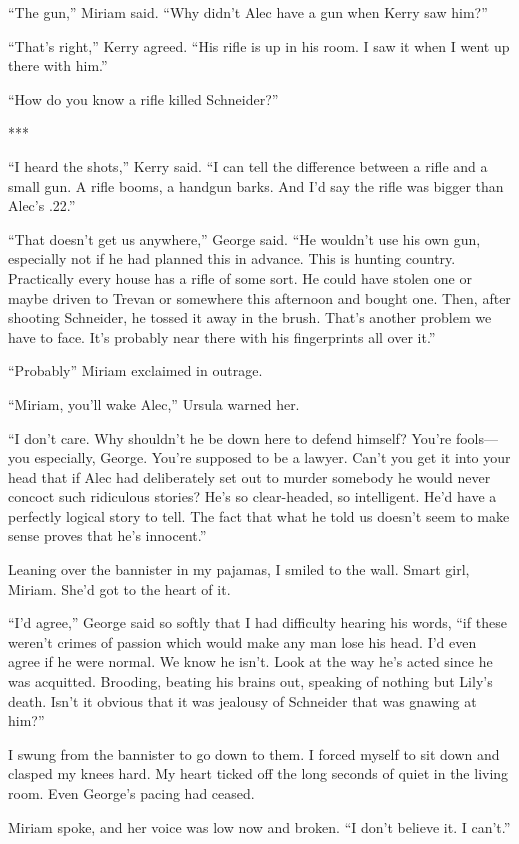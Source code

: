 {“The gun,” Miriam said. “Why didn’t Alec have a gun when Kerry saw him?”

“That’s right,” Kerry agreed. “His rifle is up in his room. I saw it when I went up there with him.”

“How do you know a rifle killed Schneider?”

***

“I heard the shots,” Kerry said. “I can tell the difference between a rifle and a small gun. A rifle booms, a handgun barks. And I’d say the rifle was bigger than Alec’s .22.”

“That doesn’t get us anywhere,” George said. “He wouldn’t use his own gun, especially not if he had planned this in advance. This is hunting country. Practically every house has a rifle of some sort. He could have stolen one or maybe driven to Trevan or somewhere this afternoon and bought one. Then, after shooting Schneider, he tossed it away in the brush. That’s another problem we have to face. It’s probably near there with his fingerprints all over it.”

“Probably” Miriam exclaimed in outrage.

“Miriam, you’ll wake Alec,” Ursula warned her.

“I don’t care. Why shouldn’t he be down here to defend himself? You’re fools—you especially, George. You’re supposed to be a lawyer. Can’t you get it into your head that if Alec had deliberately set out to murder somebody he would never concoct such ridiculous stories? He’s so clear-headed, so intelligent. He’d have a perfectly logical story to tell. The fact that what he told us doesn’t seem to make sense proves that he’s innocent.”

Leaning over the bannister in my pajamas, I smiled to the wall. Smart girl, Miriam. She’d got to the heart of it.

“I’d agree,” George said so softly that I had difficulty hearing his words, “if these weren’t crimes of passion which would make any man lose his head. I’d even agree if he were normal. We know he isn’t. Look at the way he’s acted since he was acquitted. Brooding, beating his brains out, speaking of nothing but Lily’s death. Isn’t it obvious that it was jealousy of Schneider that was gnawing at him?”

I swung from the bannister to go down to them. I forced myself to sit down and clasped my knees hard. My heart ticked off the long seconds of quiet in the living room. Even George’s pacing had ceased.

Miriam spoke, and her voice was low now and broken. “I don’t believe it. I can’t.”

}
